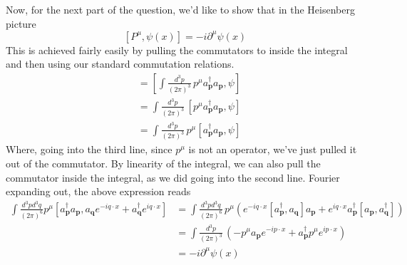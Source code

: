 Now, for the next part of the question, we'd like to show that in the Heisenberg picture \[ [ P^\mu, \psi(x) ] =  - i \partial^\mu \psi( x) \] 
This is achieved fairly easily by pulling the commutators to inside the integral and then using our standard commutation relations. 
\begin{align*} 
[P^\mu, \psi(x) ] & = [ \int \frac{d^3 p }{ (2 \pi )^3 } \,  p^\mu a_\mathbf{p}^\dagger a_\mathbf{p}, \psi ] \\
&= \int \frac{ d^3 p }{ (2 \pi )^3} \, [ p^\mu a_\mathbf{p}^\dagger a_\mathbf{p} , \psi ] \\ 
&= \int \frac{d^3 p}{ ( 2\pi) ^3 } \, p^\mu [a_\mathbf{p}^\dagger a_\mathbf{p} , \psi ] 
\end {align*} 
Where, going into the third line, since $p^\mu$ is not an operator, we've just pulled it out of the commutator. By linearity of the integral, we can also pull the commutator inside the integral, as we did going into the second line. Fourier expanding out, the above expression reads 
\begin{align*} 
\int \frac{ d^3 p d^3 q }{ ( 2 \pi )^6 } p^\mu [ a_\mathbf{p}^\dagger a_\mathbf{p}, a_\mathbf{q} e^{ - i q \cdot x } + a_\mathbf{q}^\dagger e^{ i q \cdot x } ] &= \int \frac{ d^3 p d^3 q }{ ( 2 \pi ) ^ 6} \, p^\mu \left( e^{ - i q \cdot x } [ a_\mathbf{p}^\dagger, a_\mathbf{q} ] a_\mathbf{p} + e^{ i q \cdot x } a_\mathbf{p}^\dagger [a_\mathbf{p}, a_\mathbf{q}^\dagger ] \right)  \\
&= \int \frac{ d^3 p }{ ( 2 \pi )^ 3} \, \left( - p^\mu a_\mathbf{p} e^ { - i p\cdot x } + a_\mathbf{p}^\dagger p^\mu e^{ i p \cdot x } \right) \\ 
&= - i \partial^\mu \psi(x)  
\end{align*} 


